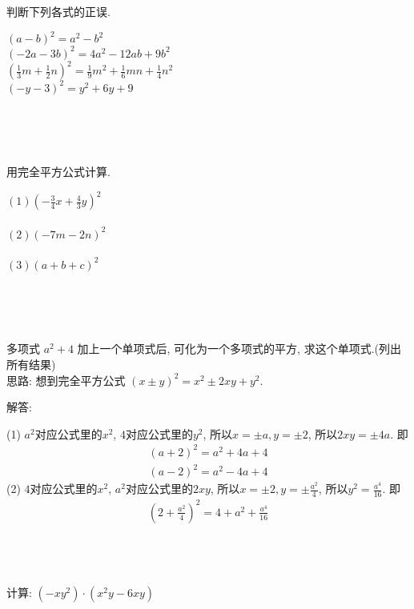 \item{
    判断下列各式的正误.

    $(a-b)^2 = a^2 - b^2$\\
    $(-2a-3b)^2 = 4a^2 - 12ab +9b^2$\\
    $(\frac13 m + \frac12 n)^2 = \frac19 m^2 + \frac16 mn + \frac14 n^2$\\
    $(-y-3)^2 = y^2 + 6y + 9$
}
\\ \\ \\

\item{
    用完全平方公式计算.

    $(1) (-\frac34 x + \frac43 y)^2$ \\ \\

    $(2) (-7m-2n)^2$ \\ \\
    
    $(3) (a+b+c)^2$ \\ \\
}
\\ \\

\item{
    多项式 $a^2 + 4$ 加上一个单项式后, 可化为一个多项式的平方, 求这个单项式.(列出所有结果)
    \ifshowSolution
    \fangsong{}
    \\
    思路: 想到完全平方公式 $(x\pm y)^2 = x^2 \pm 2xy + y^2$.

    解答: 

    (1) $a^2$对应公式里的$x^2$, $4$对应公式里的$y^2$, 所以$x= \pm a, y= \pm 2$, 所以$2xy = \pm 4a$. 即
    \begin{align*}
        (a+2)^2 = a^2 + 4a + 4 \\
        (a-2)^2 = a^2 - 4a + 4
    \end{align*}
    (2) $4$对应公式里的$x^2$, $a^2$对应公式里的$2xy$, 所以$x= \pm 2, y=\pm \frac{a^2}{4}$, 所以$y^2 = \frac{a^4}{16}$. 即
    \begin{align*}
        (2 + \frac{a^2}{4})^2 = 4 + a^2 + \frac{a^4}{16}
    \end{align*}
    \fi
    \unless\ifshowSolution
    \\ \\ \\
    \fi
}

\item{
    计算: $(-xy^2)\cdot (x^2y - 6xy)$
}
\\ \\ \\

